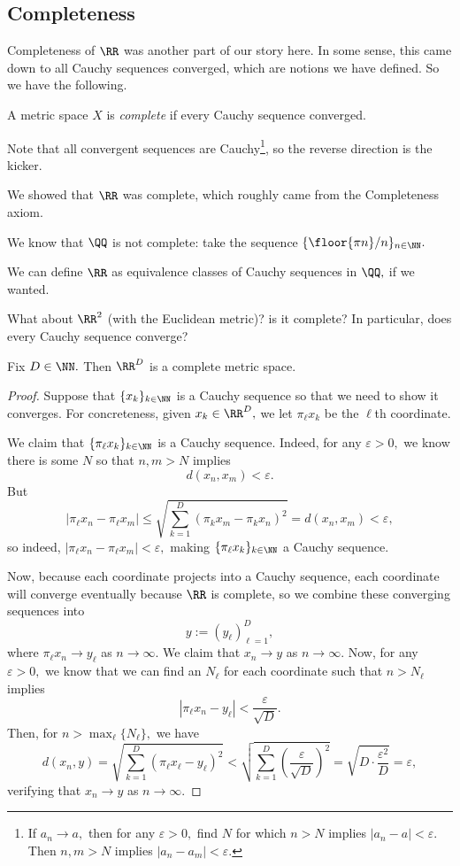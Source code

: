 \documentclass[../notes.tex]{subfiles}
\begin{document}
\subsection{Completeness}
Completeness of $\RR$ was another part of our story here. In some sense, this came down to all Cauchy sequences converged, which are notions we have defined. So we have the following.
\begin{definition}[Complete]
	A metric space $X$ is \textit{complete} if every Cauchy sequence converged.
\end{definition}
Note that all convergent sequences are Cauchy\footnote{If $a_n\to a,$ then for any $\varepsilon>0,$ find $N$ for which $n>N$ implies $|a_n-a|<\varepsilon.$ Then $n,m>N$ implies $|a_n-a_m|<\varepsilon.$}, so the reverse direction is the kicker.
\begin{example}
	We showed that $\RR$ was complete, which roughly came from the Completeness axiom.
\end{example}
\begin{nex}
	We know that $\QQ$ is not complete: take the sequence $\{\floor{\pi n}/n\}_{n\in\NN}.$
\end{nex}
\begin{remark}
	We can define $\RR$ as equivalence classes of Cauchy sequences in $\QQ,$ if we wanted.
\end{remark}
What about $\RR^2$ (with the Euclidean metric)? is it complete? In particular, does every Cauchy sequence converge?
\begin{proposition}
	Fix $D\in\NN.$ Then $\RR^D$ is a complete metric space.
\end{proposition}
\begin{proof}
	Suppose that $\{x_k\}_{k\in\NN}$ is a Cauchy sequence so that we need to show it converges. For concreteness, given $x_k\in\RR^D,$ we let $\pi_\ell x_k$ be the $\ell$th coordinate.

	We claim that $\{\pi_\ell x_k\}_{k\in\NN}$ is a Cauchy sequence. Indeed, for any $\varepsilon>0,$ we know there is some $N$ so that $n,m>N$ implies
	\[d(x_n,x_m)<\varepsilon.\]
	But
	\[|\pi_\ell x_n-\pi_\ell x_m|\le\sqrt{\sum_{k=1}^D(\pi_kx_m-\pi_kx_n)^2}=d(x_n,x_m)<\varepsilon,\]
	so indeed, $|\pi_\ell x_n-\pi_\ell x_m|<\varepsilon,$ making $\{\pi_\ell x_k\}_{k\in\NN}$ a Cauchy sequence.

	Now, because each coordinate projects into a Cauchy sequence, each coordinate will converge eventually because $\RR$ is complete, so we combine these converging sequences into
	\[y:=(y_\ell)_{\ell=1}^D,\]
	where $\pi_\ell x_n\to y_\ell$ as $n\to\infty.$ We claim that $x_n\to y$ as $n\to\infty.$ Now, for any $\varepsilon>0,$ we know that we can find an $N_\ell$ for each coordinate such that $n>N_\ell$ implies
	\[|\pi_\ell x_n-y_\ell|<\frac{\varepsilon}{\sqrt D}.\]
	Then, for $n>\max_\ell\{N_\ell\},$ we have
	\[d(x_n,y)=\sqrt{\sum_{k=1}^D(\pi_\ell x_\ell-y_\ell)^2}<\sqrt{\sum_{k=1}^D\left(\frac{\varepsilon}{\sqrt D}\right)^2}=\sqrt{D\cdot\frac{\varepsilon^2}D}=\varepsilon,\]
	verifying that $x_n\to y$ as $n\to\infty.$
\end{proof}
\end{document}
